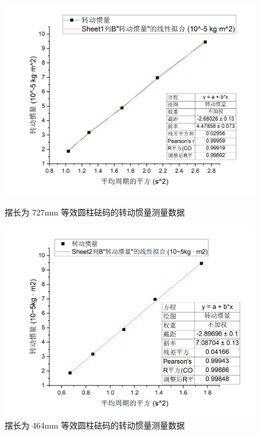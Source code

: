 \documentclass{article}
\begin{document}
\begin{figure}[h!]
    \centering
    \begin{minipage}{0.48\textwidth}
        \centering
        \includegraphics[width=\textwidth]{Young.png}
        \caption{摆长为 727mm 等效圆柱砝码的转动惯量测量数据}
        \label{fig:irregular_data_727}
    \end{minipage}
    \hfill
    \begin{minipage}{0.48\textwidth}
        \centering
        \includegraphics[width=\textwidth]{464.png}
        \caption{摆长为 464mm 等效圆柱砝码的转动惯量测量数据}
        \label{fig:irregular_data_464}
    \end{minipage}
\end{figure}
\end{document}
